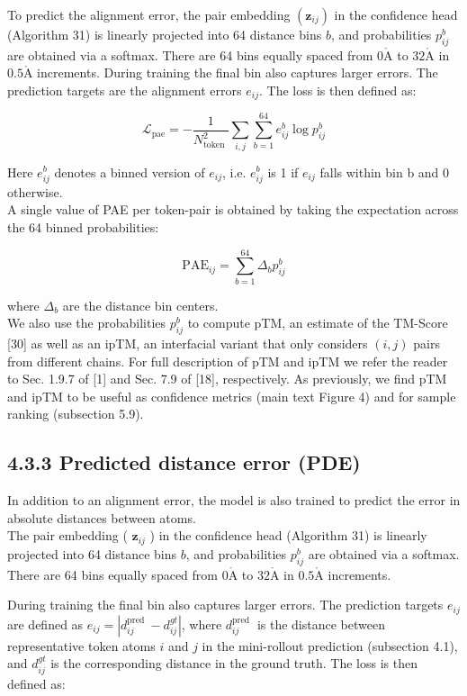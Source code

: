 \documentclass[10pt]{article}
\def\AA{\mathring{\mathrm{A}}}
\begin{document}
To predict the alignment error, the pair embedding $\left(\mathbf{z}_{i j}\right)$ in the confidence head (Algorithm 31) is linearly projected into 64 distance bins $b$, and probabilities $p_{i j}^{b}$ are obtained via a softmax. There are 64 bins equally spaced from $0 \AA$ to $32 \AA$ in $0.5 \AA$ increments. During training the final bin also captures larger errors. The prediction targets are the alignment errors $e_{i j}$. The loss is then defined as:


\begin{equation*}
\mathcal{L}_{\mathrm{pae}}=-\frac{1}{N_{\text {token }}^{2}} \sum_{i, j} \sum_{b=1}^{64} e_{i j}^{b} \log p_{i j}^{b} \tag{10}
\end{equation*}


Here $e_{i j}^{b}$ denotes a binned version of $e_{i j}$, i.e. $e_{i j}^{b}$ is 1 if $e_{i j}$ falls within bin b and 0 otherwise.\\
A single value of PAE per token-pair is obtained by taking the expectation across the 64 binned probabilities:


\begin{equation*}
\mathrm{PAE}_{i j}=\sum_{b=1}^{64} \Delta_{b} p_{i j}^{b} \tag{11}
\end{equation*}


where $\Delta_{b}$ are the distance bin centers.\\
We also use the probabilities $p_{i j}^{b}$ to compute pTM, an estimate of the TM-Score [30] as well as an ipTM, an interfacial variant that only considers $(i, j)$ pairs from different chains. For full description of pTM and ipTM we refer the reader to Sec. 1.9.7 of [1] and Sec. 7.9 of [18], respectively. As previously, we find pTM and ipTM to be useful as confidence metrics (main text Figure 4) and for sample ranking (subsection 5.9).

\subsection*{4.3.3 Predicted distance error (PDE)}
In addition to an alignment error, the model is also trained to predict the error in absolute distances between atoms.\\
The pair embedding ( $\mathbf{z}_{i j}$ ) in the confidence head (Algorithm 31) is linearly projected into 64 distance bins $b$, and probabilities $p_{i j}^{b}$ are obtained via a softmax. There are 64 bins equally spaced from $0 \AA$ to $32 \AA$ in $0.5 \AA$ increments.

During training the final bin also captures larger errors. The prediction targets $e_{i j}$ are defined as $e_{i j}=\left|d_{i j}^{\text {pred }}-d_{i j}^{g t}\right|$, where $d_{i j}^{\text {pred }}$ is the distance between representative token atoms $i$ and $j$ in the mini-rollout prediction (subsection 4.1), and $d_{i j}^{g t}$ is the corresponding distance in the ground truth. The loss is then defined as:
\end{document}
